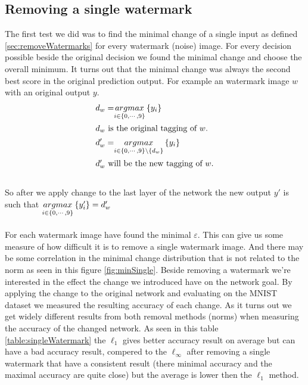 \documentclass{easychair}
\begin{document}
\subsection{Removing a single watermark}
The first test we did was to find the minimal change of a single input as defined \ref{sec:removeWatermarks} for every watermark (noise) image. For every decision possible beside the original decision we found the minimal change and choose the overall minimum. It turns out that the minimal change was always the second best score in the original prediction output. For example an watermark image $w$ with an original output $y$.
\\
\begin{align*}
d_w=&\underset{i\in\left\lbrace 0,\cdots,9\right\rbrace}{argmax}\left\lbrace y_i\right\rbrace \\
\intertext{$d_w$ is the original tagging of $w$.}
d'_w=&\underset{i\in\left\lbrace 0,\cdots,9\right\rbrace\setminus\left\lbrace d_w\right\rbrace}{argmax}\left\lbrace y_i\right\rbrace \\
\intertext{$d'_w$ will be the new tagging of $w$.}
\end{align*}
\\
So after we apply change to the last layer of the network the new output $y'$ is such that $\underset{i\in\left\lbrace 0,\cdots,9\right\rbrace}{argmax}\left\lbrace y'_i\right\rbrace=d'_w$
\\\\
For each watermark image have found the minimal $\varepsilon$. This can give us some measure of how difficult it is to remove a single watermark image. And there may be some correlation in the minimal change distribution that is not related to the norm as seen in this figure \ref{fig:minSingle}. Beside removing a watermark we're interested in the effect the change we introduced have on the network goal. By applying the change to the original network and evaluating on the MNIST dataset we measured the resulting accuracy of each change. As it turns out we get widely different results from both removal methods (norms) when measuring the accuracy of the changed network. As seen in this table \ref{table:singleWatermark} the $\ell_1$ gives better accuracy result on average but can have a bad accuracy result, compered to the $\ell_\infty$ after removing a single watermark that have a consistent result (there minimal accuracy and the maximal accuracy are quite close) but the average is lower then the $\ell_1$ method.
\\\\
\end{document}
